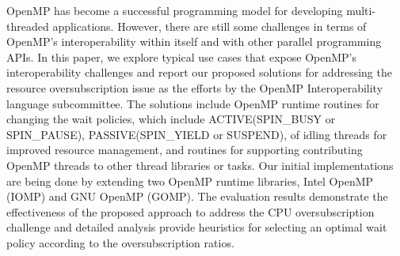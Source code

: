 OpenMP has become a successful programming model
for developing multi-threaded applications.
However, there are still some challenges in terms of OpenMP's interoperability
within itself and with other parallel programming APIs.
In this paper, we explore typical use cases that expose OpenMP's interoperability challenges and
report our proposed solutions for addressing the resource oversubscription issue as the efforts
by the OpenMP Interoperability language subcommittee. 
The solutions include OpenMP runtime routines for
changing the wait policies, which include ACTIVE(SPIN\_BUSY or SPIN\_PAUSE), 
PASSIVE(SPIN\_YIELD or SUSPEND), 
of idling threads for improved resource management, and 
routines for supporting contributing OpenMP threads to other thread libraries or tasks. 
Our initial implementations are being done by extending two OpenMP runtime libraries, 
Intel OpenMP (IOMP) and GNU OpenMP (GOMP).
The evaluation results demonstrate the effectiveness of the proposed approach to address the CPU 
oversubscription challenge and detailed analysis provide heuristics for selecting an optimal wait policy according
to the oversubscription ratios. 


